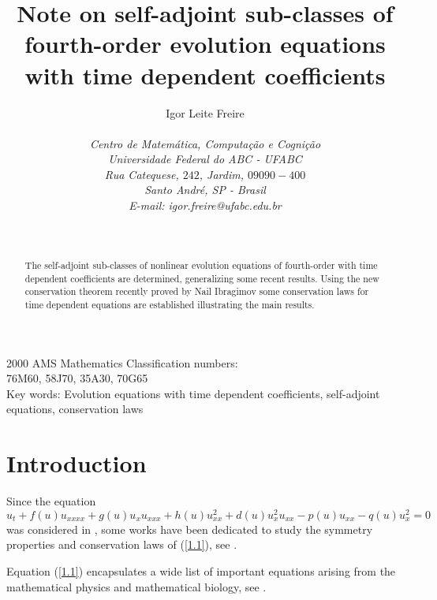 \documentclass[11pt,letterpaper,twoside]{article}
\newcommand{\bb}{\begin{equation}}
\newcommand{\ee}{\end{equation}}
\begin{document}
\title{\huge \bf Note on self-adjoint sub-classes of fourth-order evolution equations with time dependent coefficients}
\author{\rm \large Igor Leite Freire \\
\\
\it Centro de Matemática, Computação e Cognição\\ \it Universidade Federal do ABC - UFABC\\ \it 
Rua Catequese, $242$,
Jardim,
$09090-400$\\\it Santo André, SP - Brasil\\
\rm E-mail: igor.freire@ufabc.edu.br\\}
\date{\ }
\maketitle
\vspace{1cm}
\begin{abstract}
The self-adjoint sub-classes of nonlinear evolution equations of fourth-order with time dependent coefficients are determined, generalizing some recent results. Using the new conservation theorem recently proved by Nail Ibragimov some conservation laws for time dependent equations are established illustrating the main results.
\end{abstract}
\vskip 1cm
\begin{center}
{2000 AMS Mathematics Classification numbers:\vspace{0.2cm}\\
76M60, 58J70, 35A30, 70G65\vspace{0.2cm} \\
Key words: Evolution equations with time dependent coefficients, self-adjoint equations, conservation laws}
\end{center}
\newpage

\section{Introduction}
Since the equation
\bb\label{1.1}
u_{t}+f(u)u_{xxxx}+g(u)u_{x}u_{xxx}+h(u)u_{xx}^{2}+d(u)u_{x}^{2}u_{xx}-p(u)u_{xx}-q(u)u_{x}^{2}=0
\ee
was considered in \cite{qu}, some works have been dedicated to study the symmetry properties and conservation laws of (\ref{1.1}), see \cite{ib1,i1,ga}. 

Equation (\ref{1.1}) encapsulates a wide list of important equations arising from the mathematical physics and mathematical biology, see \cite{ib1,qu,i1}. 
\end{document}

